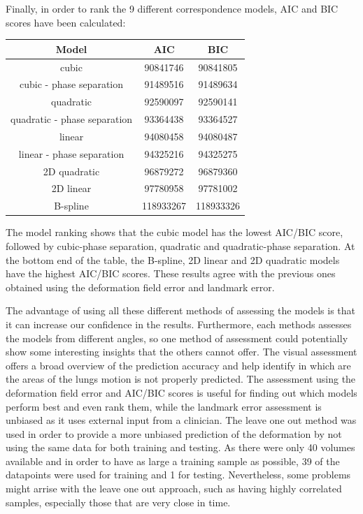 \documentclass[11pt,a4paper,oneside]{report}
\begin{document}
Finally, in order to rank the 9 different correspondence models, AIC and BIC scores have been calculated:
\begin{center}
\begin{tabular}{c | c | c}
  Model & AIC & BIC\\
  \hline
cubic & 90841746 & 90841805\\
cubic - phase separation & 91489516 & 91489634\\
quadratic & 92590097 & 92590141\\
quadratic - phase separation & 93364438 & 93364527\\
linear & 94080458 & 94080487\\
linear - phase separation & 94325216 & 94325275\\
2D quadratic & 96879272 & 96879360\\
2D linear & 97780958 & 97781002\\
B-spline & 118933267 & 118933326\\
\end{tabular}
\end{center}

The model ranking shows that the cubic model has the lowest AIC/BIC score, followed by cubic-phase separation, quadratic and quadratic-phase separation. At the bottom end of the table, the B-spline, 2D linear and 2D quadratic models have the highest AIC/BIC scores. These results agree with the previous ones obtained using the deformation field error and landmark error.

The advantage of using all these different methods of assessing the models is that it can increase our confidence in the results. Furthermore, each methods assesses the models from different angles, so one method of assessment could potentially show some interesting insights that the others cannot offer. The visual assessment offers a broad overview of the prediction accuracy and help identify in which are the areas of the lungs motion is not properly predicted. The assessment using the deformation field error and AIC/BIC scores is useful for finding out which models perform best and even rank them, while the landmark error assessment is unbiased as it uses external input from a clinician. The leave one out method was used in order to provide a more unbiased prediction of the deformation by not using the same data for both training and testing. As there were only 40 volumes available and in order to have as large a training sample as possible, 39 of the datapoints were used for training and 1 for testing. Nevertheless, some problems might arrise with the leave one out approach, such as having highly correlated samples, especially those that are very close in time.
\end{document}
